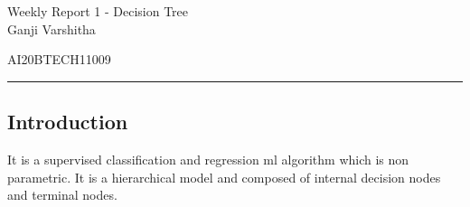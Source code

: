 \documentclass[12pt,letterpaper, onecolumn]{exam}
\begin{document}
\newtheorem{theorem}{Theorem}[section]
\newtheorem{problem}{Problem}
\newtheorem{proposition}{Proposition}[section]
\newtheorem{lemma}{Lemma}[section]
\newtheorem{corollary}[theorem]{Corollary}
\newtheorem{example}{Example}[section]
\newtheorem{definition}[problem]{Definition}

\newcommand{\BEQA}{\begin{eqnarray}}
\newcommand{\EEQA}{\end{eqnarray}}
\newcommand{\define}{\stackrel{\triangle}{=}}

\raggedbottom
\setlength{\parindent}{0pt}
\providecommand{\mbf}{\mathbf}
\providecommand{\norm}[1]{\lVert#1\rVert}
\providecommand{\pr}[1]{\ensuremath{\Pr\left(#1\right)}}
\providecommand{\qfunc}[1]{\ensuremath{Q\left(#1\right)}}
\providecommand{\sbrak}[1]{\ensuremath{{}\left[#1\right]}}
\providecommand{\lsbrak}[1]{\ensuremath{{}\left[#1\right.}}
\providecommand{\rsbrak}[1]{\ensuremath{{}\left.#1\right]}}
\providecommand{\brak}[1]{\ensuremath{\left(#1\right)}}
\providecommand{\lbrak}[1]{\ensuremath{\left(#1\right.}}
\providecommand{\rbrak}[1]{\ensuremath{\left.#1\right)}}
\providecommand{\cbrak}[1]{\ensuremath{\left\{#1\right\}}}
\providecommand{\lcbrak}[1]{\ensuremath{\left\{#1\right.}}
\providecommand{\rcbrak}[1]{\ensuremath{\left.#1\right\}}}
\let\vec\mathbf




\begingroup  
    \centering
    
    \LARGE Weekly Report 1 - Decision Tree \\[0.5em]

    \large Ganji Varshitha\par
    \large AI20BTECH11009\par
\endgroup
\rule{\textwidth}{0.4pt}
\pointsdroppedatright   %
\printanswers
\newcommand\Solution{
  \textbf{Solution:}\hspace{3mm}}
\newcommand{\myvec}[1]{\ensuremath{\begin{bmatrix}#1\end{bmatrix}}}

\subsection*{Introduction}
It is a supervised classification and regression ml algorithm which is non parametric. It is a hierarchical model and composed of internal decision nodes and terminal nodes.
\end{document}
